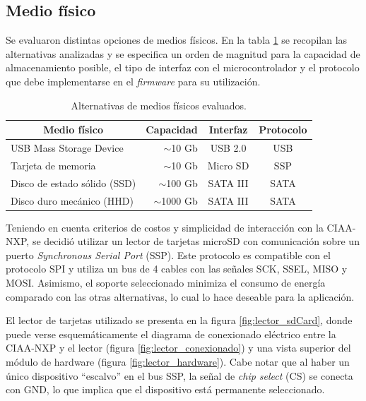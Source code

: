 \subsection{Medio físico}
\label{subsec:mediofisico}

Se evaluaron distintas opciones de medios físicos.  En la tabla \ref{tab:medios} se recopilan las alternativas analizadas y se especifica un orden de magnitud para la capacidad de almacenamiento posible, el tipo de interfaz con el microcontrolador y el protocolo que debe implementarse en el \textit{firmware} para su utilización.

\vspace{10px}

\begin{table}[ht]
\centering
\caption{Alternativas de medios físicos evaluados.}
\label{tab:medios}
\begin{tabular}{lrcc}
\toprule
\multicolumn{1}{c}{\textbf{Medio físico}} & \multicolumn{1}{c}{\textbf{Capacidad}} & \textbf{Interfaz} & \textbf{Protocolo} \\ \midrule
USB Mass Storage Device                   & $\sim$10 Gb                            & USB 2.0           & USB                \\
Tarjeta de memoria                        & $\sim$10 Gb                            & Micro SD          & SSP                \\
Disco de estado sólido (SSD)              & $\sim$100 Gb                           & SATA III          & SATA               \\
Disco duro mecánico (HHD)                 & $\sim$1000 Gb                          & SATA III          & SATA               \\ \bottomrule
\end{tabular}
\end{table}

\vspace{10px}

Teniendo en cuenta criterios de costos y simplicidad de interacción con la CIAA-NXP, se decidió utilizar un lector de tarjetas microSD con comunicación sobre un puerto \textit{Synchronous Serial Port} (SSP).  Este protocolo es compatible con el protocolo SPI y utiliza un bus de 4 cables con las señales SCK, SSEL, MISO y MOSI.  Asimismo, el soporte seleccionado minimiza el consumo de energía comparado con las otras alternativas, lo cual lo hace deseable para la aplicación.  

El lector de tarjetas utilizado se presenta en la figura \ref{fig:lector_sdCard}, donde puede verse esquemáticamente el diagrama de conexionado eléctrico entre la CIAA-NXP y el lector (figura \ref{fig:lector_conexionado}) y una vista superior del módulo de hardware (figura \ref{fig:lector_hardware}). Cabe notar que al haber un único dispositivo ``escalvo'' en el bus SSP, la señal de \textit{chip select} (CS) se conecta con GND, lo que implica que el dispositivo está permanente seleccionado.

